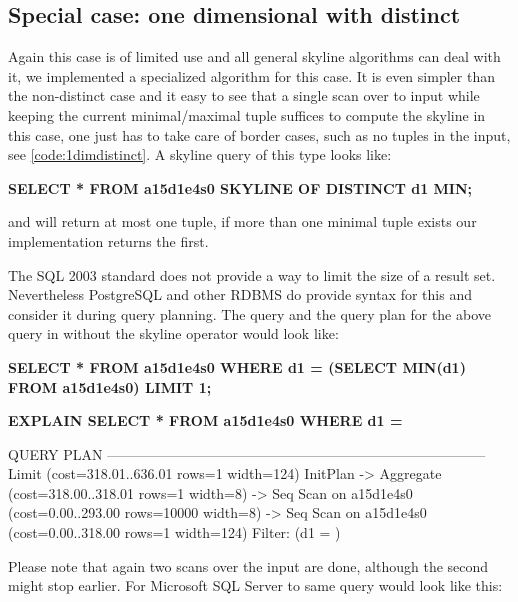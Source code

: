 \subsection{Special case: one dimensional with distinct}
\label{sec:onedim-distinct}
Again this case is of limited use and all general skyline algorithms
can deal with it, we implemented a specialized algorithm for this
case.  It is even simpler than the non-distinct case and it easy to
see that a single scan over to input while keeping the current
minimal/maximal tuple suffices to compute the skyline in this case,
one just has to take care of border cases, such as no tuples in the
input, see \autoref{code:1dimdistinct}. A skyline query of this type looks
like:

\begin{interactive}
\textbf{SELECT * FROM a15d1e4s0 SKYLINE OF DISTINCT d1 MIN;}
\end{interactive}

\noindent
and will return at most one tuple, if more than one minimal tuple
exists our implementation returns the first.

The SQL 2003 standard \citep{SQL2003} does not provide a way
to limit the size of a result set. Nevertheless PostgreSQL and other
RDBMS do provide syntax for this and consider it during query
planning. The query and the query plan for the above query in without
the skyline operator would look like:

\begin{interactive}
\textbf{SELECT * FROM a15d1e4s0 WHERE d1 = (SELECT MIN(d1) FROM a15d1e4s0) LIMIT 1;}

\textbf{EXPLAIN SELECT * FROM a15d1e4s0 WHERE d1 = }\ellipsis

                                    QUERY PLAN                                   
---------------------------------------------------------------------------------
 Limit  (cost=318.01..636.01 rows=1 width=124)
   InitPlan
     ->  Aggregate  (cost=318.00..318.01 rows=1 width=8)
           ->  Seq Scan on a15d1e4s0  (cost=0.00..293.00 rows=10000 width=8)
   ->  Seq Scan on a15d1e4s0  (cost=0.00..318.00 rows=1 width=124)
         Filter: (d1 = )
\end{interactive}

\noindent
Please note that again two scans over the input are done, although the
second might stop earlier. For Microsoft SQL Server to same query
would look like this:

